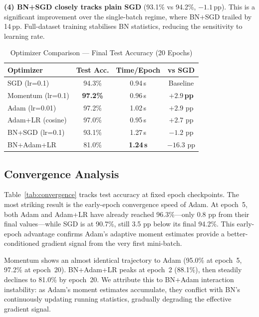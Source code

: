 \documentclass[conference]{IEEEtran}
\begin{document}
\textbf{(4) BN+SGD closely tracks plain SGD} (93.1\% vs 94.2\%, $-1.1$\,pp). This is a significant improvement over the single-batch regime, where BN+SGD trailed by 14\,pp. Full-dataset training stabilises BN statistics, reducing the sensitivity to learning rate.

\begin{table}[htbp]
\caption{Optimizer Comparison — Final Test Accuracy (20 Epochs)}
\begin{center}
\begin{tabular}{lccc}
\toprule
\textbf{Optimizer} & \textbf{Test Acc.} & \textbf{Time/Epoch} & \textbf{vs SGD}\\
\midrule
SGD (lr=0.1)       & 94.3\% & 0.94\,s & Baseline \\
Momentum (lr=0.1)  & \textbf{97.2\%} & 0.96\,s & $\mathbf{+2.9}$\,\textbf{pp} \\
Adam (lr=0.01)     & 97.2\% & 1.02\,s & $+2.9$ pp \\
Adam+LR (cosine)   & 97.0\% & 0.95\,s & $+2.7$ pp \\
BN+SGD (lr=0.1)    & 93.1\% & 1.27\,s & $-1.2$ pp \\
BN+Adam+LR         & 81.0\% & \textbf{1.24\,s} & $-16.3$ pp \\
\bottomrule
\end{tabular}
\label{tab:optimizer}
\end{center}
\end{table}

\subsection{Convergence Analysis}

Table~\ref{tab:convergence} tracks test accuracy at fixed epoch checkpoints. The most striking result is the early-epoch convergence speed of Adam. At epoch~5, both Adam and Adam+LR have already reached 96.3\%—only 0.8 pp from their final values—while SGD is at 90.7\%, still 3.5 pp below its final 94.2\%. This early-epoch advantage confirms Adam's adaptive moment estimates provide a better-conditioned gradient signal from the very first mini-batch.

Momentum shows an almost identical trajectory to Adam (95.0\% at epoch~5, 97.2\% at epoch~20). BN+Adam+LR peaks at epoch~2 (88.1\%), then steadily declines to 81.0\% by epoch~20. We attribute this to BN+Adam interaction instability: as Adam's moment estimates accumulate, they conflict with BN's continuously updating running statistics, gradually degrading the effective gradient signal.
\end{document}
